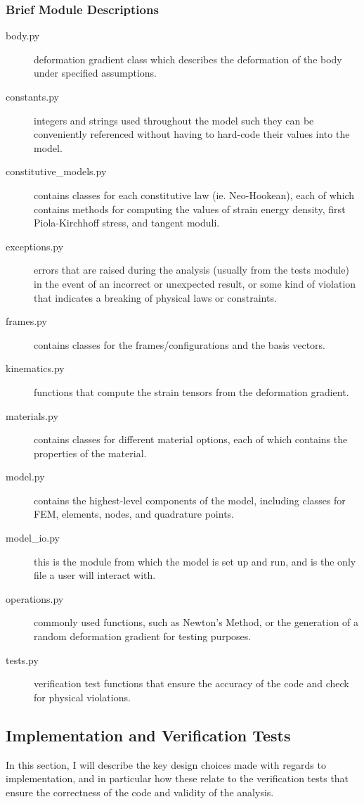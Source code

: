 \documentclass[]{spie}  %
\begin{document}
\subsubsection{Brief Module Descriptions}
\begin{description}
	\item[body.py] deformation gradient class which describes the deformation of the body under specified assumptions.
	\item[constants.py] integers and strings used throughout the model such they can be conveniently referenced without having to hard-code their values into the model.
	\item[constitutive\_models.py] contains classes for each constitutive law (ie. Neo-Hookean), each of which contains methods for computing the values of strain energy density, first Piola-Kirchhoff stress, and tangent moduli.
	\item[exceptions.py] errors that are raised during the analysis (usually from the tests module) in the event of an incorrect or unexpected result, or some kind of violation that indicates a breaking of physical laws or constraints.
	\item[frames.py] contains classes for the frames/configurations and the basis vectors.
	\item[kinematics.py] functions that compute the strain tensors from the deformation gradient. 
	\item[materials.py] contains classes for different material options, each of which contains the properties of the material.
	\item[model.py] contains the highest-level components of the model, including classes for FEM, elements, nodes, and quadrature points.
	\item[model\_io.py] this is the module from which the model is set up and run, and is the only file a user will interact with. 
	\item[operations.py] commonly used functions, such as Newton's Method, or the generation of a random deformation gradient for testing purposes. 
	\item[tests.py] verification test functions that ensure the accuracy of the code and check for physical violations.
\end{description}

\subsection{Implementation and Verification Tests}
In this section, I will describe the key design choices made with regards to implementation, and in particular how these relate to the verification tests that ensure the correctness of the code and validity of the analysis. 
\end{document}
